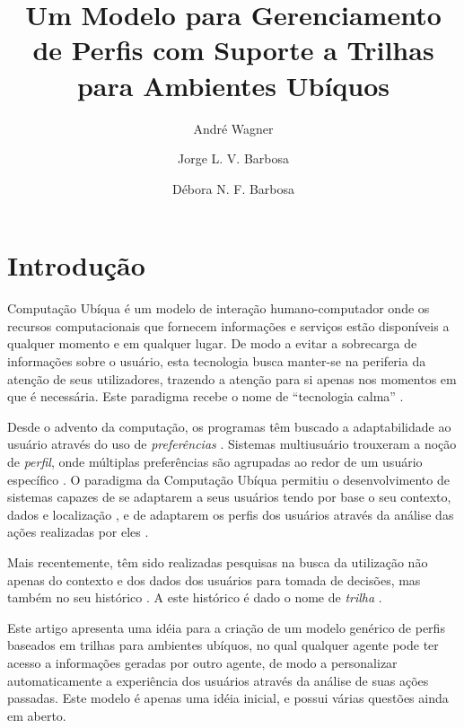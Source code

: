 \documentclass[a4paper, twocolumn]{article}
\author{André Wagner \and Jorge L. V. Barbosa \and Débora N. F. Barbosa}
\title{Um Modelo para Gerenciamento de Perfis com Suporte a Trilhas para Ambientes Ubíquos}
\begin{document}
\maketitle


\section{Introdução}


Computação Ubíqua \cite{weiser91} é um modelo de interação humano-computador onde os recursos computacionais que fornecem informações e serviços estão disponíveis a qualquer momento e em qualquer lugar. De modo a evitar a sobrecarga de informações sobre o usuário, esta tecnologia busca manter-se na periferia da atenção de seus utilizadores, trazendo a atenção para si apenas nos momentos em que é necessária. Este paradigma recebe o nome de ``tecnologia calma'' \cite{weiser96}.


Desde o advento da computação, os programas têm buscado a adaptabilidade ao usuário através do uso de \emph{preferências} \cite{??}. Sistemas multiusuário trouxeram a noção de \emph{perfil}, onde múltiplas preferências são agrupadas ao redor de um usuário específico \cite{??}. O paradigma da Computação Ubíqua permitiu o desenvolvimento de sistemas capazes de se adaptarem a seus usuários tendo por base o seu contexto, dados e localização \cite{schilit94, dey2001}, e de adaptarem os perfis dos usuários através da análise das ações realizadas por eles \cite{pelep}.


Mais recentemente, têm sido realizadas pesquisas na busca da utilização não apenas do contexto e dos dados dos usuários para tomada de decisões, mas também no seu histórico \cite{smith08,silva09}. A este histórico é dado o nome de \emph{trilha} \cite{driver08}.


Este artigo apresenta uma idéia para a criação de um modelo genérico de perfis baseados em trilhas para ambientes ubíquos, no qual qualquer agente pode ter acesso a informações geradas por outro agente, de modo a personalizar automaticamente a experiência dos usuários através da análise de suas ações passadas. Este modelo é apenas uma idéia inicial, e possui várias questões ainda em aberto.
\end{document}
